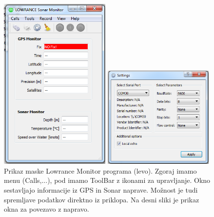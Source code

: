 \begin{figure}[!h]
	\begin{minipage}{5.5cm}
		\centering \includegraphics[width=5.5cm]{Vaje/KartGlobSlan/figs/no_fix.png}
	\end{minipage}
	\begin{minipage}{5.5cm}
		\centering \includegraphics[width=5.5cm]{Vaje/KartGlobSlan/figs/connect.png}
		\vspace{3.3cm}
	\end{minipage}	
	\caption{Prikaz maske Lowrance Monitor programa (levo). Zgoraj imamo menu (Calls,...), pod imamo ToolBar z ikonami za upravljanje. Okno sestavljajo informacije iz GPS in Sonar naprave. Možnost je tudi spremljave podatkov direktno iz priklopa. Na desni sliki je prikaz okna za povezavo z napravo.}
	\label{fig:v_est_lmp_01}
\end{figure}

